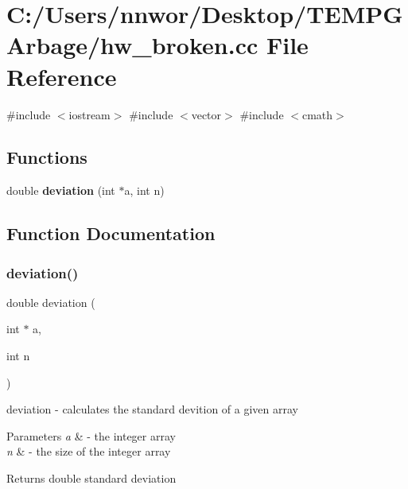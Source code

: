 \section{C\+:/\+Users/nnwor/\+Desktop/\+T\+E\+M\+P\+G\+Arbage/hw\+\_\+broken.cc File Reference}
\label{hw__broken_8cc}
{\ttfamily \#include $<$iostream$>$}\newline
{\ttfamily \#include $<$vector$>$}\newline
{\ttfamily \#include $<$cmath$>$}\newline
\subsection*{Functions}
\begin{DoxyCompactItemize}
\item 
double \textbf{ deviation} (int $\ast$a, int n)
\end{DoxyCompactItemize}


\subsection{Function Documentation}
\mbox{\label{hw__broken_8cc_a9cfdbe00bb990c14c3a9e59a7dbbc974}} 
\subsubsection{deviation()}
{\footnotesize\ttfamily double deviation (\begin{DoxyParamCaption}\item[{int $\ast$}]{a,  }\item[{int}]{n }\end{DoxyParamCaption})}

deviation -\/ calculates the standard devition of a given array


\begin{DoxyParams}{Parameters}
{\em a} & -\/ the integer array \\
\hline
{\em n} & -\/ the size of the integer array \\
\hline
\end{DoxyParams}
\begin{DoxyReturn}{Returns}
double standard deviation 
\end{DoxyReturn}
